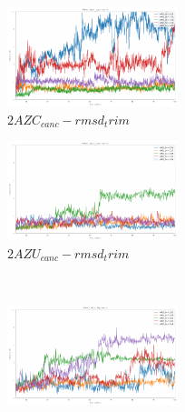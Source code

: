 \documentclass[fleqn,10pt]{wlscirep}
\begin{document}
\begin{figure}[!ht]
\centering
   \begin{subfigure}{.45\textwidth}
     \centering
     \includegraphics[width=.95\linewidth]{2AZC_canc/2AZC_canc-rmsd-trim}
     \caption{$2AZC_{canc}-rmsd_trim$}
     \label{fig:2AZC_canc-rmsd_trim}
   \end{subfigure}
   \begin{subfigure}{.45\textwidth}
     \centering
     \includegraphics[width=.95\linewidth]{2AZU_canc/2AZU_canc-rmsd-trim}
     \caption{$2AZU_{canc}-rmsd_trim$}
     \label{fig:2AZU_canc-rmsd_trim}
   \end{subfigure}
   \\
   \begin{subfigure}{.45\textwidth}
     \centering
     \includegraphics[width=.95\linewidth]{2AZC_flip/2AZC_flip-rmsd-trim}

\end{subfigure}
\end{figure}
\end{document}
